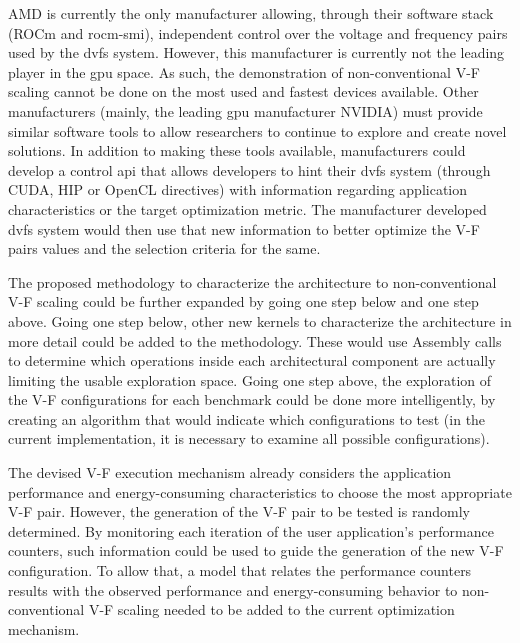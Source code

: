 AMD is currently the only manufacturer allowing, through their software stack (ROCm and rocm-smi), independent control over the voltage and frequency pairs used by the \acrshort{dvfs} system. However, this manufacturer is currently not the leading player in the \acrshort{gpu} space. As such, the demonstration of non-conventional V-F scaling cannot be done on the most used and fastest devices available. Other manufacturers (mainly, the leading \acrshort{gpu} manufacturer NVIDIA) must provide similar software tools to allow researchers to continue to explore and create novel solutions. In addition to making these tools available, manufacturers could develop a control \acrshort{api} that allows developers to hint their \acrshort{dvfs} system (through CUDA, HIP or OpenCL directives) with information regarding application characteristics or the target optimization metric. The manufacturer developed \acrshort{dvfs} system would then use that new information to better optimize the V-F pairs values and the selection criteria for the same.

The proposed methodology to characterize the architecture to non-conventional V-F scaling could be further expanded by going one step below and one step above. Going one step below, other new kernels to characterize the architecture in more detail could be added to the methodology. These would use Assembly calls to determine which operations inside each architectural component are actually limiting the usable exploration space. Going one step above, the exploration of the V-F configurations for each benchmark could be done more intelligently, by creating an algorithm that would indicate which configurations to test (in the current implementation, it is necessary to examine all possible configurations).

The devised V-F execution mechanism already considers the application performance and energy-consuming characteristics to choose the most appropriate V-F pair. However, the generation of the V-F pair to be tested is randomly determined. By monitoring each iteration of the user application's performance counters, such information could be used to guide the generation of the new V-F configuration. To allow that, a model that relates the performance counters results with the observed performance and energy-consuming behavior to non-conventional V-F scaling needed to be added to the current optimization mechanism.

